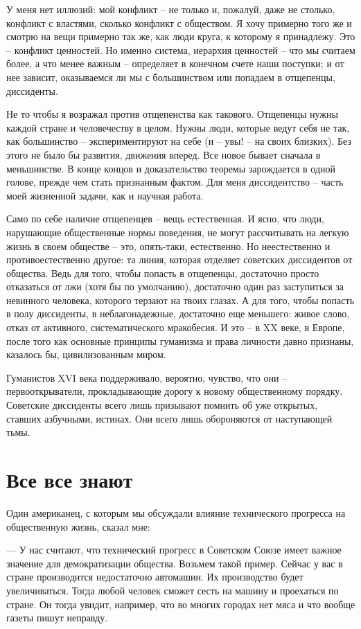 \documentclass{book}
\begin{document}
У меня нет иллюзий: мой конфликт -- не только и, пожа­луй, даже не столько, конфликт с властями, сколько конфликт с обществом. Я хочу примерно того же и смотрю на вещи при­мерно так же, как люди круга, к которому я принадлежу. Это -- конфликт ценностей. Но именно система, иерархия цен­ностей -- что мы считаем более, а что менее важным -- опреде­ляет в конечном счете наши поступки; и от нее зависит, оказы­ваемся ли мы с большинством или попадаем в отщепенцы, диссиденты.

Не то чтобы я возражал против отщепенства как такового. Отщепенцы нужны каждой стране и человечеству в целом. Нужны люди, которые ведут себя не так, как большинство -- экспериментируют на себе (и -- увы! -- на своих близких). Без этого не было бы развития, движения вперед. Все новое бывает сначала в меньшинстве. В конце концов и доказательст­во теоремы зарождается в одной голове, прежде чем стать при­знанным фактом. Для меня диссидентство -- часть моей жиз­ненной задачи, как и научная работа.

Само по себе наличие отщепенцев -- вещь естественная. И яс­но, что люди, нарушающие общественные нормы поведения, не могут рассчитывать на легкую жизнь в своем обществе -- это, опять-таки, естественно. Но неестественно и противоестествен­но другое: та линия, которая отделяет советских диссидентов от общества. Ведь для того, чтобы попасть в отщепенцы, доста­точно просто отказаться от лжи (хотя бы по умолчанию), до­статочно один раз заступиться за невинного человека, которо­го терзают на твоих глазах. А для того, чтобы попасть в полу диссиденты, в неблагонадежные, достаточно еще меньшего: живое слово, отказ от активного, систематического мракобе­сия. И это -- в XX веке, в Европе, после того как основные принципы гуманизма и права личности давно признаны, казалось бы, цивилизованным миром.

Гуманистов XVI века поддерживало, вероятно, чувство, что они -- первооткрыватели, прокладывающие дорогу к ново­му общественному порядку. Советские диссиденты всего лишь призывают помнить об уже открытых, ставших азбучными, истинах. Они всего лишь обороняются от наступающей тьмы.


\section{Все все знают}

Один американец, с которым мы обсуждали влияние технического прогресса на общественную жизнь, сказал мне:

--- У нас считают, что технический прогресс в Советском Союзе имеет важное значение для демократизации общества. Возьмем такой пример. Сейчас у вас в стране производится недостаточно автомашин. Их производство будет увеличиваться. Тогда любой человек сможет сесть на машину и проехаться по стране. Он тогда увидит, например, что во многих городах нет мяса и что вообще газеты пишут неправду.
\end{document}
